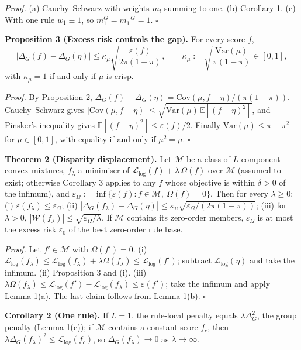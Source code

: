 \documentclass[pdflatex,sn-basic,Numbered,lineno]{sn-jnl}
\begin{document}
\emph{Proof.} (a) Cauchy--Schwarz with weights \(\bar m_l\) summing to one. (b) Corollary 1. (c) With one rule \(\bar w_1 \equiv 1\), so \(m_1^G = m_1^{\neg G} = 1\). \(\square\)

\textbf{Proposition 3 (Excess risk controls the gap).} For every score \(f\), \[|\Delta_{G}(f) - \Delta_{G}(\eta)| \leq \kappa_{\mu}\sqrt{\frac{\varepsilon(f)}{2\pi(1 - \pi)}},\qquad \kappa_{\mu} := \sqrt{\frac{\mathrm{Var}(\mu)}{\pi(1 - \pi)}} \in [0,1], \tag{6}\] with \(\kappa_{\mu} = 1\) if and only if \(\mu\) is crisp.

\emph{Proof.} By Proposition 2, \(\Delta_{G}(f) - \Delta_{G}(\eta) = \mathrm{Cov}(\mu,f - \eta)/(\pi(1 - \pi))\). Cauchy--Schwarz gives \(|\mathrm{Cov}(\mu,f - \eta)| \leq \sqrt{\mathrm{Var}(\mu)\,\mathbb{E}[(f - \eta)^{2}]}\), and Pinsker's inequality \cite{cover} gives \(\mathbb{E}[(f - \eta)^{2}] \leq \varepsilon(f)/2\). Finally \(\mathrm{Var}(\mu) \leq \pi - \pi^{2}\) for \(\mu \in [0,1]\), with equality if and only if \(\mu^2 = \mu\). \(\square\)

\textbf{Theorem 2 (Disparity displacement).} Let \(\mathcal{M}\) be a class of \(L\)-component convex mixtures, \(f_{\lambda}\) a minimiser of \(\mathcal{L}_{\log}(f) + \lambda\,\Omega(f)\) over \(\mathcal{M}\) (assumed to exist; otherwise Corollary 3 applies to any \(f\) whose objective is within \(\delta > 0\) of the infimum), and \(\varepsilon_{\Omega} := \inf\{\varepsilon(f): f \in \mathcal{M},\ \Omega(f) = 0\}\). Then for every \(\lambda \geq 0\): (i) \(\varepsilon(f_{\lambda}) \leq \varepsilon_{\Omega}\); (ii) \(|\Delta_{G}(f_{\lambda}) - \Delta_{G}(\eta)| \leq \kappa_{\mu}\sqrt{\varepsilon_{\Omega}/(2\pi(1 - \pi))}\); (iii) for \(\lambda > 0\), \(|\mathcal{W}(f_{\lambda})| \leq \sqrt{\varepsilon_{\Omega}/\lambda}\). If \(\mathcal{M}\) contains its zero-order members, \(\varepsilon_{\Omega}\) is at most the excess risk \(\varepsilon_{0}\) of the best zero-order rule base.

\emph{Proof.} Let \(f' \in \mathcal{M}\) with \(\Omega(f') = 0\). (i) \(\mathcal{L}_{\log}(f_{\lambda}) \leq \mathcal{L}_{\log}(f_{\lambda}) + \lambda\Omega(f_\lambda) \leq \mathcal{L}_{\log}(f')\); subtract \(\mathcal{L}_{\log}(\eta)\) and take the infimum. (ii) Proposition 3 and (i). (iii) \(\lambda\Omega(f_{\lambda}) \leq \mathcal{L}_{\log}(f') - \mathcal{L}_{\log}(f_\lambda) \leq \varepsilon(f')\); take the infimum and apply Lemma 1(a). The last claim follows from Lemma 1(b). \(\square\)

\textbf{Corollary 2 (One rule).} If \(L = 1\), the rule-local penalty equals \(\lambda\Delta_G^2\), the group penalty (Lemma 1(c)); if \(\mathcal M\) contains a constant score \(f_c\), then \(\lambda\Delta_{G}(f_\lambda)^2 \le \mathcal{L}_{\log}(f_c)\), so \(\Delta_{G}(f_\lambda) \to 0\) as \(\lambda \to \infty\).
\end{document}
